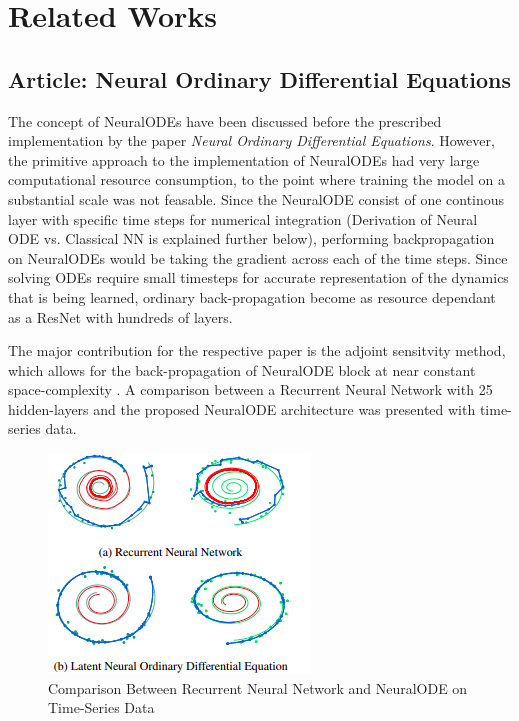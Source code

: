\documentclass{article}
\begin{document}
\section{Related Works}

\subsection{Article: Neural Ordinary Differential Equations}

The concept of NeuralODEs have been discussed before the prescribed implementation by the paper
\textit{Neural Ordinary Differential Equations}. However, the primitive approach to the implementation of
NeuralODEs had very large computational resource consumption, to the point where training the model
on a substantial scale was not feasable. Since the NeuralODE consist of one continous layer with specific time steps
for numerical integration (Derivation of Neural ODE vs. Classical NN is explained further below), performing backpropagation
on NeuralODEs would be taking the gradient across each of the time steps. Since solving ODEs require small timesteps for accurate
representation of the dynamics that is being learned, ordinary back-propagation become as resource dependant as a ResNet with hundreds
of layers.

The major contribution for the respective paper is the adjoint sensitvity method, which allows for the back-propagation of
NeuralODE block at near constant space-complexity \cite{15He}. A comparison between a Recurrent Neural Network with 25
hidden-layers and the proposed NeuralODE architecture was presented with time-series data. 

\begin{figure}[H]
   \centering
   \includegraphics[width=0.75\linewidth]
   {./TimeSeries.png}
   \caption{Comparison Between Recurrent Neural Network and NeuralODE on Time-Series Data \cite{15He}}
   \label{fig:my_label}
\end{figure}
\end{document}
